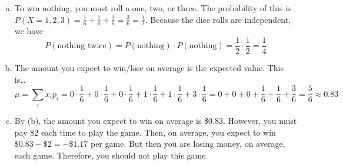 \documentclass[11pt,letterpaper]{article}
\begin{document}
\sol
\begin{enumerate}[(a)]
\item To win nothing, you must roll a one, two, or three. The probability of this is $P(X= 1, 2, 3)= \frac{1}{6} + \frac{1}{6} + \frac{1}{6}= \frac{3}{6}= \frac{1}{2}$. Because the dice rolls are independent, we have
	\[
	P(\text{nothing twice})= P(\text{nothing}) \cdot P(\text{nothing})= \dfrac{1}{2} \cdot \dfrac{1}{2}= \dfrac{1}{4}
	\] \pspace

\item The amount you expect to win/lose on average is the expected value. This is\dots
	\[
	\mu= \sum_i x_i p_i= 0 \cdot \dfrac{1}{6} +  0 \cdot \dfrac{1}{6} +  0 \cdot \dfrac{1}{6} + 1 \cdot \dfrac{1}{6} + 1 \cdot \dfrac{1}{6} + 3 \cdot \dfrac{1}{6}= 0 + 0 + 0 + \dfrac{1}{6} + \dfrac{1}{6} + \dfrac{3}{6}= \dfrac{5}{6} \approx 0.83
	\] \pspace

\item By (b), the amount you expect to win on average is \$0.83. However, you must pay \$2 each time to play the game. Then, on average, you expect to win $\$0.83 - \$2= -\$1.17$ per game. But then you are losing money, on average, each game. Therefore, you should not play this game. 
\end{enumerate}
\end{document}
